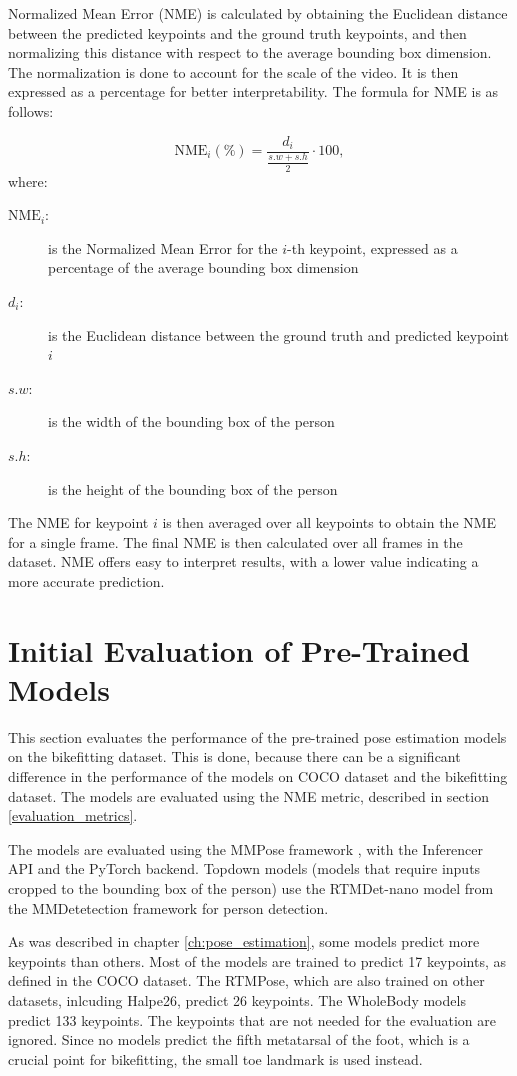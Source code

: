 Normalized Mean Error (NME) is calculated by obtaining the Euclidean distance between the predicted keypoints and the ground truth keypoints, and then normalizing this distance with respect to the average bounding box dimension. The normalization is done to account for the scale of the video. It is then expressed as a percentage for better interpretability. The formula for NME is as follows:

$$ \text{NME}_i (\%)= \frac{d_i}{\frac{{s.w} + {s.h}}{2}} \cdot 100, $$
%
where:
\begin{description}
    \item[$\text{NME}_i$:] is the Normalized Mean Error for the $i$-th keypoint, expressed as a percentage of the average bounding box dimension
    \item[$d_i$:] is the Euclidean distance between the ground truth and predicted keypoint $i$
    \item[$s.w$:] is the width of the bounding box of the person
    \item[$s.h$:] is the height of the bounding box of the person
\end{description}

The NME for keypoint $i$ is then averaged over all keypoints to obtain the NME for a single frame. The final NME is then calculated over all frames in the dataset. NME offers easy to interpret results, with a lower value indicating a more accurate prediction.

\section{Initial Evaluation of Pre-Trained Models}
\label{initial_evaluation}
This section evaluates the performance of the pre-trained pose estimation models on the bikefitting dataset. This is done, because there can be a significant difference in the performance of the models on COCO dataset and the bikefitting dataset. The models are evaluated using the NME metric, described in section \ref{evaluation_metrics}.

The models are evaluated using the MMPose framework \cite{mmpose2020}, with the Inferencer API and the PyTorch backend. Topdown models (models that require inputs cropped to the bounding box of the person) use the RTMDet-nano model \cite{rtmdet} from the MMDetetection framework \cite{mmdetection} for person detection.

As was described in chapter \ref{ch:pose_estimation}, some models predict more keypoints than others. Most of the models are trained to predict 17 keypoints, as defined in the COCO dataset. The RTMPose, which are also trained on other datasets, inlcuding Halpe26, predict 26 keypoints. The WholeBody models predict 133 keypoints. The keypoints that are not needed for the evaluation are ignored. Since no models predict the fifth metatarsal of the foot, which is a crucial point for bikefitting, the small toe landmark is used instead.

